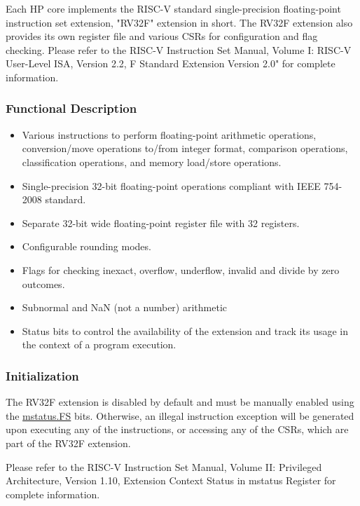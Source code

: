 \documentclass[main\_\_EN.tex]{subfiles}
\begin{document}
Each HP core implements the RISC-V standard single-precision floating-point instruction set extension, "RV32F" extension in short. The RV32F extension also provides its own register file and various CSRs for configuration and flag checking. Please refer to the RISC-V Instruction Set Manual, Volume I: RISC-V User-Level ISA, Version 2.2, F Standard Extension Version 2.0" for complete information.

\subsubsection{Functional Description}
\label{sec:riscvcpu-fpu-func-descr}

\begin{itemize}
    \item Various instructions to perform floating-point arithmetic operations, conversion/move operations to/from integer format, comparison operations, classification operations, and memory load/store operations.
    \item Single-precision 32-bit floating-point operations compliant with IEEE 754-2008 standard.
    \item Separate 32-bit wide floating-point register file with 32 registers.
    \item Configurable rounding modes.
    \item Flags for checking inexact, overflow, underflow, invalid and divide by zero outcomes.
    \item Subnormal and NaN (not a number) arithmetic
    \item Status bits to control the availability of the extension and track its usage in the context of a program execution.
\end{itemize}

\subsubsection{Initialization}
\label{sec:riscvcpu-fpu-init}

The RV32F extension is disabled by default and must be manually enabled using the \hyperref[fielddesc:MSTATUS_FS]{mstatus.FS} bits. Otherwise, an illegal instruction exception will be generated upon executing any of the instructions, or accessing any of the CSRs, which are part of the RV32F extension.

Please refer to the RISC-V Instruction Set Manual, Volume II: Privileged Architecture, Version 1.10, Extension Context Status in mstatus Register for complete information.
\end{document}
